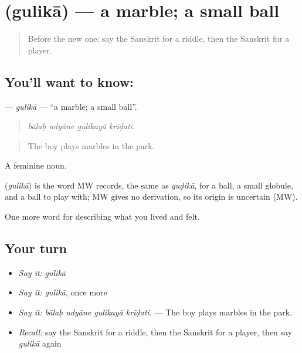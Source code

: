 \section[\texorpdfstring{\sk{गुलिका} (gulikā)}{गुलिका (gulikā)}]{ (gulikā) — a marble; a small ball}

\label{lesson:SA-C517-gulika}



\begin{quote}
Before the new one: say the Sanskrit for a riddle, then the Sanskrit for a player.
\end{quote}

\subsection*{You'll want to know: }
\textbf{} — \emph{gulikā} — \textquotedblleft{}a marble; a small ball\textquotedblright{}.

\begin{quote}
   
\end{quote}

\begin{quote}
\emph{bālaḥ udyāne gulikayā krīḍati.}
\end{quote}

\begin{quote}
The boy plays marbles in the park.
\end{quote}

A feminine noun.

\begin{cousinweb}
\textbf{} (\emph{gulikā}) is the word MW records, the same as \emph{guḍikā}, for a ball, a small globule, and a ball to play with; MW gives no derivation, so its origin is uncertain (MW).
\end{cousinweb}

\begin{grammarlens}[title={What you've built}]
One more word for describing what you lived and felt.
\end{grammarlens}

\subsection*{Your turn}
\begin{itemize}
\raggedright
  \item \emph{Say it:} \emph{gulikā}
  \item \emph{Say it:} \emph{gulikā}, once more
  \item \emph{Say it:} \emph{bālaḥ udyāne gulikayā krīḍati.} — The boy plays marbles in the park.
  \item \emph{Recall:} say the Sanskrit for a riddle, then the Sanskrit for a player, then say \emph{gulikā} again
\end{itemize}

